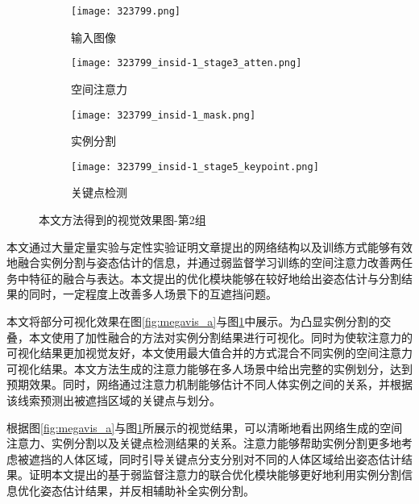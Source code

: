 \begin{figure}[H]
\begin{minipage}[t]{\linewidth}
		\vskip5pt
		\begin{subfigure}[b]{0.23\linewidth}
			\texttt{[image: 323799.png]}
			\caption{输入图像}
		\end{subfigure}
		\begin{subfigure}[b]{0.23\linewidth}
			\texttt{[image: 323799\_insid-1\_stage3\_atten.png]}
			\caption{空间注意力}
		\end{subfigure}
		\begin{subfigure}[b]{0.23\linewidth}
			\texttt{[image: 323799\_insid-1\_mask.png]}
			\caption{实例分割}
		\end{subfigure}
		\begin{subfigure}[b]{0.23\linewidth}
			\texttt{[image: 323799\_insid-1\_stage5\_keypoint.png]}
			\caption{关键点检测}
		\end{subfigure}
	\end{minipage}
	\caption{本文方法得到的视觉效果图-第2组}
	\label{fig:megavis_b}
\end{figure}

本文通过大量定量实验与定性实验证明文章提出的网络结构以及训练方式能够有效地融合实例分割与姿态估计的信息，并通过弱监督学习训练的空间注意力改善两任务中特征的融合与表达。本文提出的优化模块能够在较好地给出姿态估计与分割结果的同时，一定程度上改善多人场景下的互遮挡问题。

本文将部分可视化效果在图\ref{fig:megavis_a}与图\ref{fig:megavis_b}中展示。为凸显实例分割的交叠，本文使用了加性融合的方法对实例分割结果进行可视化。同时为使软注意力的可视化结果更加视觉友好，本文使用最大值合并的方式混合不同实例的空间注意力可视化结果。本文方法生成的注意力能够在多人场景中给出完整的实例划分，达到预期效果。同时，网络通过注意力机制能够估计不同人体实例之间的关系，并根据该线索预测出被遮挡区域的关键点与划分。

根据图\ref{fig:megavis_a}与图\ref{fig:megavis_b}所展示的视觉结果，可以清晰地看出网络生成的空间注意力、实例分割以及关键点检测结果的关系。注意力能够帮助实例分割更多地考虑被遮挡的人体区域，同时引导关键点分支分别对不同的人体区域给出姿态估计结果。证明本文提出的基于弱监督注意力的联合优化模块能够更好地利用实例分割信息优化姿态估计结果，并反相辅助补全实例分割。



